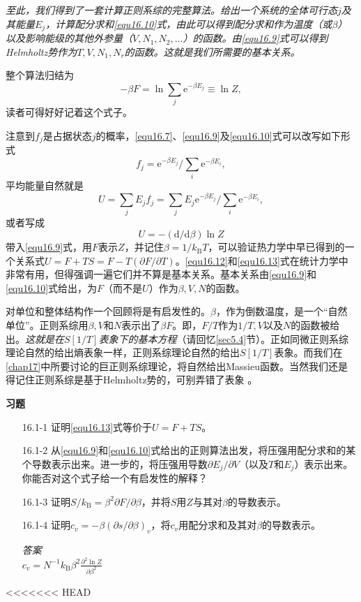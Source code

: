 {\it 至此，我们得到了一套计算正则系综的完整算法。给出一个系统的全体可行态$j$及其能量$E_j$，计算配分求和\ref{equ16.10}式，由此可以得到配分求和作为温度（或$\beta$）以及影响能级的其他外参量（$V,N_1,N_2,\dots$）的函数。由\eqref{equ16.9}式可以得到Helmholtz势作为$T,V,N_1,N_r$的函数。这就是我们所需要的基本关系。}

整个算法归结为
\begin{equation}
-\beta F = \ln \sum\limits_j \mathrm e^{-\beta E_j} \equiv \ln Z,
\end{equation}
读者可得好好记着这个式子。

注意到$f_j$是占据状态$j$的概率，\eqref{equ16.7}、\eqref{equ16.9}及\eqref{equ16.10}式可以改写如下形式
\begin{equation}
f_j  = {\mathrm e}^{-\beta E_j}/\sum\limits_i \mathrm e^{-\beta E_i},
\end{equation}
平均能量自然就是
\begin{equation}
U = \sum\limits_j E_jf_j = \sum\limits_j E_j{\mathrm e}^{-\beta E_j}/\sum\limits_i \mathrm e^{-\beta E_i},
\label{equ16.12}
\end{equation}
或者写成
\begin{equation}
U = -(\mathrm d/\mathrm d\beta)\ln Z
\label{equ16.13}
\end{equation}
带入\eqref{equ16.9}式，用$F$表示$Z$，并记住$\beta = 1/k_\text{B}T$，可以验证热力学中早已得到的一个关系式$U=F+TS=F-T(\partial F/\partial T)$。\eqref{equ16.12}和\eqref{equ16.13}式在统计力学中非常有用，但得强调一遍它们并不算是基本关系。基本关系由\eqref{equ16.9}和\eqref{equ16.10}式给出，为$F$（而不是$U$）作为$\beta,V,N$的函数。

对单位和整体结构作一个回顾将是有启发性的。$\beta$，作为倒数温度，是一个“自然单位”。正则系综用$\beta,V$和$N$表示出了$\beta F$。即，$F/T$作为$1/T,V$以及$N$的函数被给出。{\it 这就是在$S[1/T]$表象下的基本方程}（请回忆\ref{sec5.4}节）。正如同微正则系综理论自然的给出熵表象一样，正则系综理论自然的给出$S[1/T]$表象。而我们在\ref{chap17}中所要讨论的巨正则系综理论，将自然给出Massieu函数。当然我们还是得记住正则系综是基于Helmholtz势的，可别弄错了表象%
%
。

{\noindent\bf 习题}
\begin{itemize}
\item[16.1-1] 证明\eqref{equ16.13}式等价于$U=F+TS$。
\item[16.1-2] 从\eqref{equ16.9}和\eqref{equ16.10}式给出的正则算法出发，将压强用配分求和的某个导数表示出来。进一步的，将压强用导数$\partial E_j/\partial V$（以及$T$和$E_j$）表示出来。你能否对这个式子给一个有启发性的解释？
\item[16.1-3] 证明$S/k_\text{B}=\beta^2\partial F/\partial\beta$，并将$S$用$Z$与其对$\beta$的导数表示。
\item[16.1-4] 证明$c_v=-\beta(\partial s/\partial\beta)_v$，将$c_v$用配分求和及其对$\beta$的导数表示。
\begin{flushleft}
{\it 答案}\\
$c_v=N^{-1}k_\text{B}\beta^2\frac{\partial^2\ln Z}{\partial \beta^2}$
\end{flushleft}
\end{itemize}
<<<<<<< HEAD

